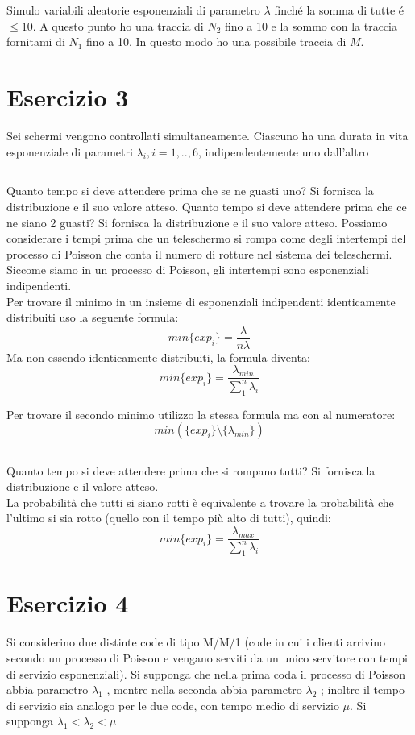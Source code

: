 \documentclass[a4paper]{article}
\begin{document}
Simulo variabili aleatorie esponenziali di parametro $\lambda$  finché la somma di tutte é $\leq 10$.
A questo punto ho una traccia di $N_2$ fino a 10 e la sommo con la traccia fornitami di $N_1$ fino a 10.
In questo modo ho una possibile traccia di $M$.

\section{Esercizio 3}
Sei schermi vengono controllati simultaneamente. Ciascuno ha una durata in vita esponenziale di parametri $\lambda_i , i = 1, .., 6$, indipendentemente uno dall’altro
\subsection{}
Quanto tempo si deve attendere prima che se ne guasti uno? Si fornisca la distribuzione e il suo valore atteso. Quanto tempo si deve attendere prima che ce ne siano 2 guasti? Si fornisca la distribuzione e il suo valore atteso.
Possiamo considerare i tempi prima che un teleschermo si rompa come degli intertempi del processo di Poisson che conta il numero di rotture nel sistema dei teleschermi.
Siccome siamo in un processo di Poisson, gli intertempi sono esponenziali indipendenti.\\
Per trovare il minimo in un insieme di esponenziali indipendenti identicamente distribuiti uso la seguente formula:
$$min\{exp_i\}= \frac{\lambda}{n \lambda}$$
Ma non essendo identicamente distribuiti, la formula diventa:
$$min\{exp_i\}= \frac{\lambda_{min}}{\sum_1^n \lambda_i}$$

Per trovare il secondo minimo utilizzo la stessa formula ma con al numeratore:  
$$min(\{exp_i\}\setminus \{\lambda_{min}\}) $$

\subsection{}
Quanto tempo si deve attendere prima che si rompano tutti? Si fornisca la distribuzione e il valore atteso.\\

La probabilità che tutti si siano rotti è equivalente a trovare la probabilità che l'ultimo si sia rotto (quello con il tempo più alto di tutti), quindi:
$$min\{exp_i\}= \frac{\lambda_{max}}{\sum_1^n \lambda_i}$$




\section{Esercizio 4}
Si considerino due distinte code di tipo M/M/1 (code in cui i clienti arrivino secondo un processo di Poisson e vengano serviti da un unico servitore con tempi di servizio esponenziali).
Si supponga che nella prima coda il processo di Poisson abbia parametro $\lambda_1$ , mentre nella seconda abbia parametro $\lambda_2$ ; inoltre il tempo di servizio sia analogo per le due code, con tempo medio di servizio $\mu$. Si supponga $\lambda_1 < \lambda_2 < \mu$
\end{document}
